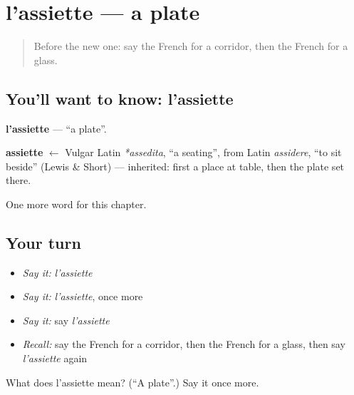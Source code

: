 \section[l'assiette]{l'assiette — a plate}

\label{lesson:FR-C76-assiette}



\begin{quote}
Before the new one: say the French for a corridor, then the French for a glass.
\end{quote}

\subsection*{You'll want to know: l'assiette}
\textbf{l'assiette} — \textquotedblleft{}a plate\textquotedblright{}.

\begin{cousinweb}
\textbf{assiette} $\leftarrow$ Vulgar Latin \emph{*assedita}, \textquotedblleft{}a seating\textquotedblright{}, from Latin \emph{assidere}, \textquotedblleft{}to sit beside\textquotedblright{} (Lewis \& Short) — inherited: first a place at table, then the plate set there.
\end{cousinweb}

\begin{grammarlens}[title={What you've built}]
One more word for this chapter.
\end{grammarlens}

\subsection*{Your turn}
\begin{itemize}
\raggedright
  \item \emph{Say it:} \emph{l'assiette}
  \item \emph{Say it:} \emph{l'assiette}, once more
  \item \emph{Say it:} say \emph{l'assiette}
  \item \emph{Recall:} say the French for a corridor, then the French for a glass, then say \emph{l'assiette} again
\end{itemize}

\begin{tcolorbox}[breakable,colback=teal!4,colframe=teal!35!black,title={Before you move on}]
What does l'assiette mean? (\textquotedblleft{}A plate\textquotedblright{}.) Say it once more.
\end{tcolorbox}
